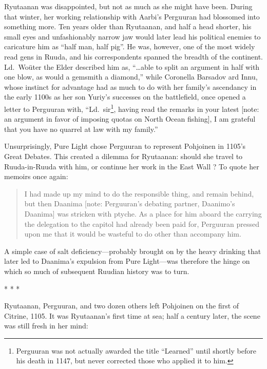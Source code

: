 \documentclass[12pt]{report}
\begin{document}
Ryutaanan was disappointed, but not as much as she might have been.
During that winter, her working relationship with Aarbi's Perguuran
had blossomed into something more.  Ten years older than Ryutaanan,
and half a head shorter, his small eyes and unfashionably narrow jaw
would later lead his political enemies to caricature him as ``half man,
half pig''.  He was, however, one of the most widely read gens in
Ruuda, and his correspondents spanned the breadth of the continent.
Ld.\ Wo\"uter the Elder described him as, ``{\ldots}able to split an
argument in half with one blow, as would a gemsmith a diamond,'' while
Coronella Barsadov ard Innu, whose instinct for advantage had as much
to do with her family's ascendancy in the early 1100s as her son
Yuriy's successes on the battlefield, once opened a letter to
Perguuran with, ``Ld.\ sir\footnote{Perguuran was not actually awarded
the title ``Learned'' until shortly before his death in 1147, but never
corrected those who applied it to him.}, having read the remarks in
your latest [note: an argument in favor of imposing quotas on North
Ocean fishing], I am grateful that you have no quarrel at law with my
family.''

Unsurprisingly, Pure Light chose Perguuran to represent Pohjoinen in
1105's Great Debates.  This created a dilemma for Ryutaanan: should
she travel to Ruuda-in-Ruuda with him, or continue her work in the
East Wall ?  To quote her memoirs once again:

\begin{quotation}
I had made up my mind to do the responsible thing, and remain behind,
but then Daanima [note: Perguuran's debating partner, Daanimo's
Daanima] was stricken with ptyche.  As a place for him aboard the
 carrying the delegation to the capitol had already been
paid for, Perguuran pressed upon me that it would be wasteful to do
other than accompany him.
\end{quotation}

A simple case of salt deficiency---probably brought on by the heavy
drinking that later led to Daanima's expulsion from Pure Light---was
therefore the hinge on which so much of subsequent Ruudian history was
to turn.

\begin{center}
* * *
\end{center}

Ryutaanan, Perguuran, and two dozen others left Pohjoinen on the first
of Citrine, 1105.  It was Ryutaanan's first time at sea; half a
century later, the scene was still fresh in her mind:
\end{document}
